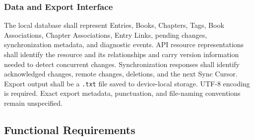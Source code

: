\documentclass[11pt,a4paper]{article}
\begin{document}
\subsubsection{Data and Export Interface}
The local database shall represent Entries, Books, Chapters, Tags, Book Associations, Chapter Associations, Entry Links, pending changes, synchronization metadata, and diagnostic events. API resource representations shall identify the resource and its relationships and carry version information needed to detect concurrent changes. Synchronization responses shall identify acknowledged changes, remote changes, deletions, and the next Sync Cursor. Export output shall be a \texttt{.txt} file saved to device-local storage. UTF-8 encoding is required. Exact export metadata, punctuation, and file-naming conventions remain unspecified.

\subsection{Functional Requirements}
\end{document}
